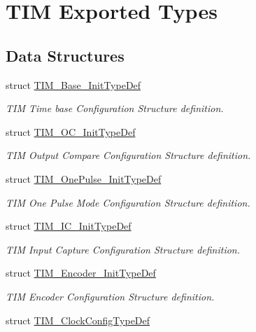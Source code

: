 \hypertarget{group___t_i_m___exported___types}{}\section{T\+IM Exported Types}
\label{group___t_i_m___exported___types}
\subsection*{Data Structures}
\begin{DoxyCompactItemize}
\item 
struct \hyperlink{struct_t_i_m___base___init_type_def}{T\+I\+M\+\_\+\+Base\+\_\+\+Init\+Type\+Def}
\begin{DoxyCompactList}\small\item\em T\+IM Time base Configuration Structure definition. \end{DoxyCompactList}\item 
struct \hyperlink{struct_t_i_m___o_c___init_type_def}{T\+I\+M\+\_\+\+O\+C\+\_\+\+Init\+Type\+Def}
\begin{DoxyCompactList}\small\item\em T\+IM Output Compare Configuration Structure definition. \end{DoxyCompactList}\item 
struct \hyperlink{struct_t_i_m___one_pulse___init_type_def}{T\+I\+M\+\_\+\+One\+Pulse\+\_\+\+Init\+Type\+Def}
\begin{DoxyCompactList}\small\item\em T\+IM One Pulse Mode Configuration Structure definition. \end{DoxyCompactList}\item 
struct \hyperlink{struct_t_i_m___i_c___init_type_def}{T\+I\+M\+\_\+\+I\+C\+\_\+\+Init\+Type\+Def}
\begin{DoxyCompactList}\small\item\em T\+IM Input Capture Configuration Structure definition. \end{DoxyCompactList}\item 
struct \hyperlink{struct_t_i_m___encoder___init_type_def}{T\+I\+M\+\_\+\+Encoder\+\_\+\+Init\+Type\+Def}
\begin{DoxyCompactList}\small\item\em T\+IM Encoder Configuration Structure definition. \end{DoxyCompactList}\item 
struct \hyperlink{struct_t_i_m___clock_config_type_def}{T\+I\+M\+\_\+\+Clock\+Config\+Type\+Def}

\end{DoxyCompactItemize}

